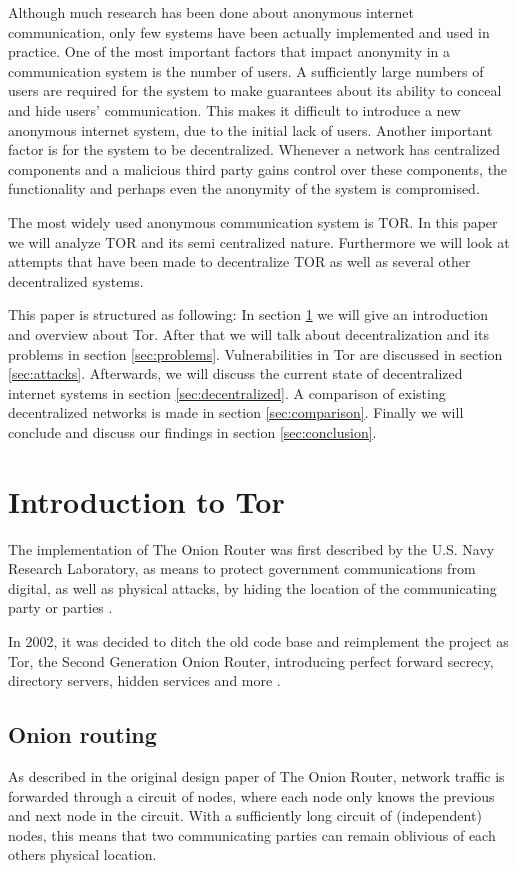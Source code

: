 \documentclass[journal]{IEEEtran}
\begin{document}
	Although much research has been done about anonymous internet communication, only few systems have been actually implemented and used in practice. One of the most important factors that impact anonymity in a communication system is the number of users. A sufficiently large numbers of users are required for the system to make guarantees about its ability to conceal and hide users' communication. This makes it difficult to introduce a new anonymous internet system, due to the initial lack of users. Another important factor is for the system to be decentralized. Whenever a network has centralized components and a malicious third party gains control over these components, the functionality and perhaps even the anonymity of the system is compromised.
	
	The most widely used anonymous communication system is TOR. In this paper we will analyze TOR and its semi centralized nature. Furthermore we will look at attempts that have been made to decentralize TOR as well as several other decentralized systems.
	
	This paper is structured as following: In section \ref{sec:tor} we will give an introduction and overview about Tor. After that we will talk about decentralization and its problems in section \ref{sec:problems}. Vulnerabilities in Tor are discussed in section \ref{sec:attacks}. Afterwards, we will discuss the current state of decentralized internet systems in section \ref{sec:decentralized}. A comparison of existing decentralized networks is made in section \ref{sec:comparison}. Finally we will conclude and discuss our findings in section \ref{sec:conclusion}.
	
\section{Introduction to Tor}
	\label{sec:tor}
	The implementation of The Onion Router was first described by the U.S. Navy Research Laboratory, as means to protect government communications from digital, as well as physical attacks, by hiding the location of the communicating party or parties \cite{goldschlag1996hiding}.

	In 2002, it was decided to ditch the old code base and reimplement the project as Tor, the Second Generation Onion Router, introducing perfect forward secrecy, directory servers, hidden services and more \cite{dingledine2004tor}.
		
	\subsection{Onion routing}
		As described in the original design paper of The Onion Router, network traffic is forwarded through a circuit of nodes, where each node only knows the previous and next node in the circuit. With a sufficiently long circuit of (independent) nodes, this means that two communicating parties can remain oblivious of each others physical location.
					
\end{document}
